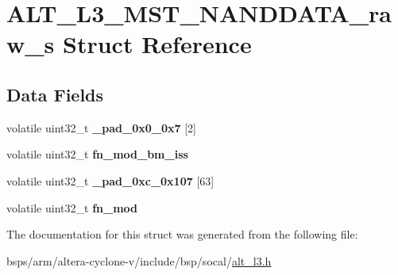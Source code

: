 \hypertarget{structALT__L3__MST__NANDDATA__raw__s}{}\section{A\+L\+T\+\_\+\+L3\+\_\+\+M\+S\+T\+\_\+\+N\+A\+N\+D\+D\+A\+T\+A\+\_\+raw\+\_\+s Struct Reference}
\label{structALT__L3__MST__NANDDATA__raw__s}
\subsection*{Data Fields}
\begin{DoxyCompactItemize}
\item 
\mbox{\label{structALT__L3__MST__NANDDATA__raw__s_a21f52116958dbe599cd797d58c15721f}} 
volatile uint32\+\_\+t {\bfseries \+\_\+pad\+\_\+0x0\+\_\+0x7} \mbox{[}2\mbox{]}
\item 
\mbox{\label{structALT__L3__MST__NANDDATA__raw__s_a274e305e49e2607171ca5dd2001c6962}} 
volatile uint32\+\_\+t {\bfseries fn\+\_\+mod\+\_\+bm\+\_\+iss}
\item 
\mbox{\label{structALT__L3__MST__NANDDATA__raw__s_a3ef26e2d4155a0b895550f807f68f232}} 
volatile uint32\+\_\+t {\bfseries \+\_\+pad\+\_\+0xc\+\_\+0x107} \mbox{[}63\mbox{]}
\item 
\mbox{\label{structALT__L3__MST__NANDDATA__raw__s_a0d928fad0d8c8a6be0d39f4e1d545b59}} 
volatile uint32\+\_\+t {\bfseries fn\+\_\+mod}
\end{DoxyCompactItemize}


The documentation for this struct was generated from the following file\+:\begin{DoxyCompactItemize}
\item 
bsps/arm/altera-\/cyclone-\/v/include/bsp/socal/\mbox{\hyperlink{alt__l3_8h}{alt\+\_\+l3.\+h}}\end{DoxyCompactItemize}
